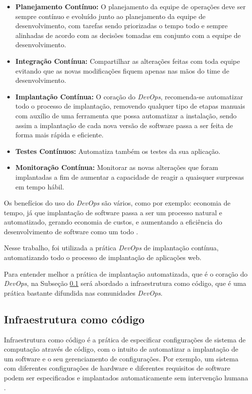  \begin{itemize}
   \item \textbf{Planejamento Contínuo:} O planejamento da equipe de operações 
deve ser sempre contínuo
   e evoluído junto ao planejamento da equipe de desenvolvimento, com tarefas
   sendo priorizadas o tempo todo e sempre alinhadas de acordo com as decisões tomadas
   em conjunto com a equipe de desenvolvimento.
   \item \textbf{Integração Contínua:} Compartilhar as alterações feitas com toda equipe
   evitando que as novas modificações fiquem apenas nas mãos do time de desenvolvimento.
   \item \textbf{Implantação Contínua:} O coração do \textit{DevOps}, recomenda-se automatizar
   todo o processo de implantação, removendo qualquer tipo de etapas manuais com auxílio
   de uma ferramenta que possa automatizar a instalação, sendo assim a implantação
   de cada nova versão de software passa a ser feita de forma mais rápida e eficiente.
   \item \textbf{Testes Contínuos:} Automatiza também os testes da sua aplicação.
   \item \textbf{Monitoração Contínua:} Monitorar as novas alterações
   que foram implantadas a fim de aumentar a capacidade de reagir a quaisquer surpresas
   em tempo hábil.
 \end{itemize}

Os benefícios do uso do \textit{DevOps} são vários, como por exemplo: economia de tempo,
já que implantação de software passa a ser um processo natural e automatizado, 
gerando economia de custos, e aumentando a eficiência do desenvolvimento de software como um todo \cite{7173368}.

Nesse trabalho, foi utilizada a prática \textit{DevOps} de implantação contínua,
automatizando todo o processo de implantação de aplicações web. 

Para entender melhor a prática de implantação automatizada, que é o coração
do \textit{DevOps}, na Subseção \ref{subsub:infracode} será abordado a infraestrutura
como código, que é uma prática bastante difundida nas comunidades \textit{DevOps}.

\subsection{Infraestrutura como código}
\label{subsub:infracode}
Infraestrutura como código é a prática de especificar configurações de
sistema de computação através de código, com o intuito de automatizar a implantação
de um software e o seu gerenciamento de configurações. Por exemplo, um sistema
com diferentes configurações de hardware e diferentes
requisitos de software podem ser especificados e implantados automaticamente
sem intervenção humana \cite{configurationcodesmell}. 

